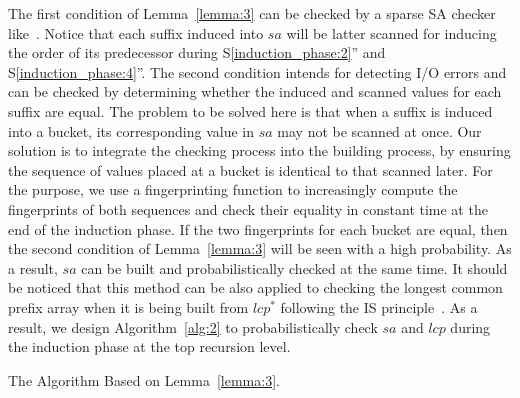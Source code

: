 \documentclass[10pt,journal,compsoc]{IEEEtran}
\begin{document}
The first condition of Lemma~\ref{lemma:3} can be checked by a sparse SA checker like~\cite{wu2017}. Notice that each suffix induced into $sa$ will be latter scanned for inducing the order of its predecessor during S\ref{induction_phase:2}'' and S\ref{induction_phase:4}''. The second condition intends for detecting I/O errors and can be checked by determining whether the induced and scanned values for each suffix are equal. The problem to be solved here is that when a suffix is induced into a bucket, its corresponding value in $sa$ may not be scanned at once. Our solution is to integrate the checking process into the building process, by ensuring the sequence of values placed at a bucket is identical to that scanned later. For the purpose, we use a fingerprinting function to increasingly compute the fingerprints of both sequences and check their equality in constant time at the end of the induction phase. If the two fingerprints for each bucket are equal, then the second condition of Lemma~\ref{lemma:3} will be seen with a high probability. As a result, $sa$ can be built and probabilistically checked at the same time. It should be noticed that this method can be also applied to checking the longest common prefix array when it is being built from $lcp^*$ following the IS principle~\cite{Fischer11}. As a result, we design Algorithm~\ref{alg:2} to probabilistically check $sa$ and $lcp$ during the induction phase at the top recursion level.


\begin{algorithm*}

	\caption{The Algorithm Based on Lemma~\ref{lemma:3}.}
	
	\label{alg:2}
	
	\end{algorithm*}
\end{document}
